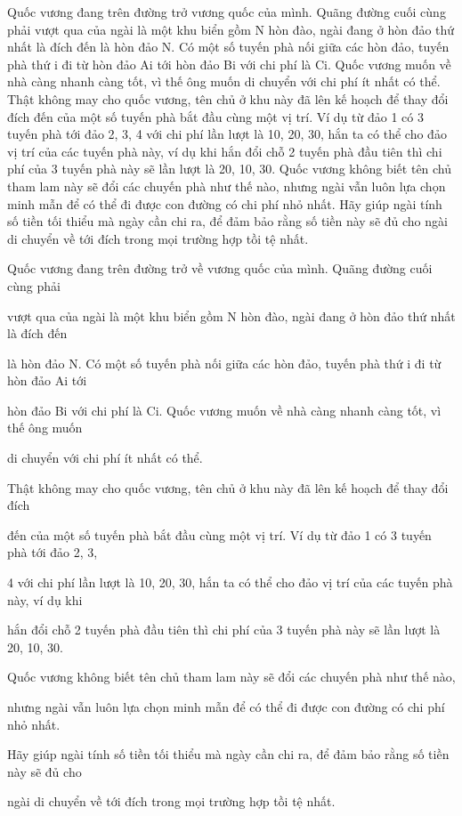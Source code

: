 Quốc vương đang trên đường trở vương quốc của mình. Quãng đường cuối cùng phải       vượt qua của ngài là một khu biển gồm N hòn đào, ngài đang ở hòn đảo thứ nhất là đích đến       là hòn đảo N. Có một số tuyến phà nối giữa các hòn đảo, tuyến phà thứ i đi từ hòn đảo Ai tới       hòn đảo Bi với chi phí là Ci. Quốc vương muốn về nhà càng nhanh càng tốt, vì thế ông muốn       di chuyển với chi phí ít nhất có thể.       Thật không may cho quốc vương, tên chủ ở khu này đã lên kế hoạch để thay đổi đích       đến của một số tuyến phà bắt đầu cùng một vị trí. Ví dụ từ đảo 1 có 3 tuyến phà tới đảo 2, 3,       4 với chi phí lần lượt là 10, 20, 30, hắn ta có thể cho đảo vị trí của các tuyến phà này, ví dụ khi       hắn đổi chỗ 2 tuyến phà đầu tiên thì chi phí của 3 tuyến phà này sẽ lần lượt là 20, 10, 30.       Quốc vương không biết tên chủ tham lam này sẽ đổi các chuyến phà như thế nào,       nhưng ngài vẫn luôn lựa chọn minh mẫn để có thể đi được con đường có chi phí nhỏ nhất.       Hãy giúp ngài tính số tiền tối thiểu mà ngày cần chi ra, để đảm bảo rằng số tiền này sẽ đủ cho       ngài di chuyển về tới đích trong mọi trường hợp tồi tệ nhất.    

   Quốc vương đang trên đường trở về vương quốc của mình. Quãng đường cuối cùng phải  

   vượt qua của ngài là một khu biển gồm N hòn đào, ngài đang ở hòn đảo thứ nhất là đích đến  

   là hòn đảo N. Có một số tuyến phà nối giữa các hòn đảo, tuyến phà thứ i đi từ hòn đảo Ai tới  

   hòn đảo Bi với chi phí là Ci. Quốc vương muốn về nhà càng nhanh càng tốt, vì thế ông muốn  

   di chuyển với chi phí ít nhất có thể.  



   Thật không may cho quốc vương, tên chủ ở khu này đã lên kế hoạch để thay đổi đích  

   đến của một số tuyến phà bắt đầu cùng một vị trí. Ví dụ từ đảo 1 có 3 tuyến phà tới đảo 2, 3,  

   4 với chi phí lần lượt là 10, 20, 30, hắn ta có thể cho đảo vị trí của các tuyến phà này, ví dụ khi  

   hắn đổi chỗ 2 tuyến phà đầu tiên thì chi phí của 3 tuyến phà này sẽ lần lượt là 20, 10, 30.  

   Quốc vương không biết tên chủ tham lam này sẽ đổi các chuyến phà như thế nào,  

   nhưng ngài vẫn luôn lựa chọn minh mẫn để có thể đi được con đường có chi phí nhỏ nhất.  

   Hãy giúp ngài tính số tiền tối thiểu mà ngày cần chi ra, để đảm bảo rằng số tiền này sẽ đủ cho  

   ngài di chuyển về tới đích trong mọi trường hợp tồi tệ nhất.